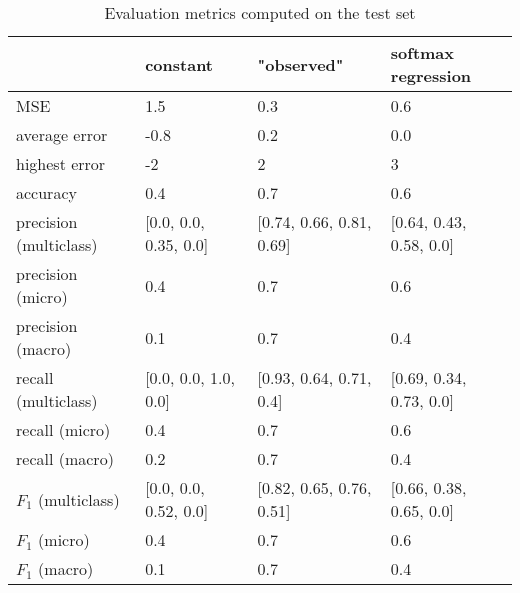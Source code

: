 \begin{table}[h]
\caption{Evaluation metrics computed on the test set}
\label{tbl:sais_eval_test}
\begin{tabular}{llll}
\toprule
 & constant & "observed" & softmax regression \\
\midrule
MSE & 1.5 & 0.3 & 0.6 \\
average error & -0.8 & 0.2 & 0.0 \\
highest error & -2 & 2 & 3 \\
accuracy & 0.4 & 0.7 & 0.6 \\
precision (multiclass) & [0.0, 0.0, 0.35, 0.0] & [0.74, 0.66, 0.81, 0.69] & [0.64, 0.43, 0.58, 0.0] \\
precision (micro) & 0.4 & 0.7 & 0.6 \\
precision (macro) & 0.1 & 0.7 & 0.4 \\
recall (multiclass) & [0.0, 0.0, 1.0, 0.0] & [0.93, 0.64, 0.71, 0.4] & [0.69, 0.34, 0.73, 0.0] \\
recall (micro) & 0.4 & 0.7 & 0.6 \\
recall (macro) & 0.2 & 0.7 & 0.4 \\
$F_1$ (multiclass) & [0.0, 0.0, 0.52, 0.0] & [0.82, 0.65, 0.76, 0.51] & [0.66, 0.38, 0.65, 0.0] \\
$F_1$ (micro) & 0.4 & 0.7 & 0.6 \\
$F_1$ (macro) & 0.1 & 0.7 & 0.4 \\
\bottomrule
\end{tabular}
\end{table}
